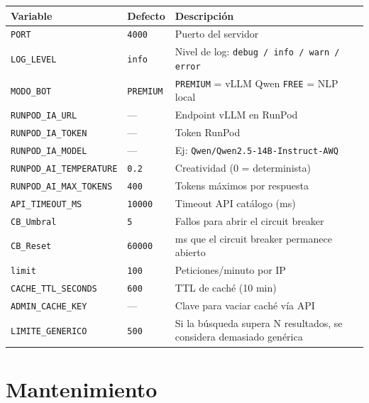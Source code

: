 \documentclass[12pt, a4paper]{article}
\begin{document}
\begin{center}
\renewcommand{\arraystretch}{1.2}
\begin{tabularx}{\textwidth}{llX}
\toprule
\textbf{Variable} & \textbf{Defecto} & \textbf{Descripción} \\
\midrule
\texttt{PORT}                    & \texttt{4000}    & Puerto del servidor \\
\texttt{LOG\_LEVEL}              & \texttt{info}    & Nivel de log: \texttt{debug / info / warn / error} \\
\texttt{MODO\_BOT}               & \texttt{PREMIUM} & \texttt{PREMIUM} = vLLM Qwen \quad \texttt{FREE} = NLP local \\
\texttt{RUNPOD\_IA\_URL}         & ---              & Endpoint vLLM en RunPod \\
\texttt{RUNPOD\_IA\_TOKEN}       & ---              & Token RunPod \\
\texttt{RUNPOD\_IA\_MODEL}       & ---              & Ej: \texttt{Qwen/Qwen2.5-14B-Instruct-AWQ} \\
\texttt{RUNPOD\_AI\_TEMPERATURE} & \texttt{0.2}     & Creatividad (0 = determinista) \\
\texttt{RUNPOD\_AI\_MAX\_TOKENS} & \texttt{400}     & Tokens máximos por respuesta \\
\texttt{API\_TIMEOUT\_MS}        & \texttt{10000}   & Timeout API catálogo (ms) \\
\texttt{CB\_Umbral}              & \texttt{5}       & Fallos para abrir el circuit breaker \\
\texttt{CB\_Reset}               & \texttt{60000}   & ms que el circuit breaker permanece abierto \\
\texttt{limit}                   & \texttt{100}     & Peticiones/minuto por IP \\
\texttt{CACHE\_TTL\_SECONDS}     & \texttt{600}     & TTL de caché (10 min) \\
\texttt{ADMIN\_CACHE\_KEY}       & ---              & Clave para vaciar caché vía API \\
\texttt{LIMITE\_GENERICO}        & \texttt{500}     & Si la búsqueda supera N resultados, se considera demasiado genérica \\
\bottomrule
\end{tabularx}
\end{center}

\section{Mantenimiento}
\end{document}
